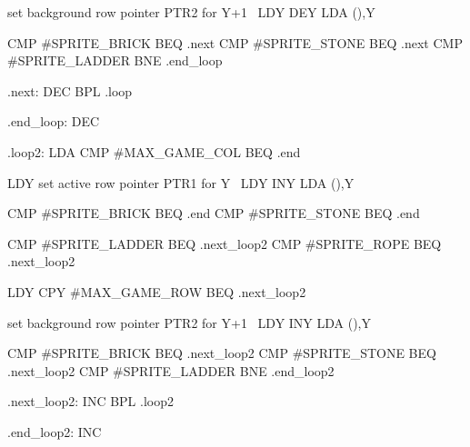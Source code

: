 \documentclass[10pt]{report}%
\begin{document}
    \LA{}set background row pointer \code{}PTR2\edoc{} for \code{}Y+1\edoc{}~{\nwtagstyle{}}\RA{}
    LDY     
    DEY
    LDA     (),Y

    CMP     #SPRITE_BRICK
    BEQ     .next
    CMP     #SPRITE_STONE
    BEQ     .next
    CMP     #SPRITE_LADDER
    BNE     .end_loop

.next:
    DEC     
    BPL     .loop

.end_loop:
    DEC     

.loop2:
    LDA     
    CMP     #MAX_GAME_COL
    BEQ     .end

    LDY     
    \LA{}set active row pointer \code{}PTR1\edoc{} for \code{}Y\edoc{}~{\nwtagstyle{}}\RA{}
    LDY     
    INY
    LDA     (),Y

    CMP     #SPRITE_BRICK
    BEQ     .end
    CMP     #SPRITE_STONE
    BEQ     .end

    CMP     #SPRITE_LADDER
    BEQ     .next_loop2
    CMP     #SPRITE_ROPE
    BEQ     .next_loop2

    LDY     
    CPY     #MAX_GAME_ROW
    BEQ     .next_loop2

    \LA{}set background row pointer \code{}PTR2\edoc{} for \code{}Y+1\edoc{}~{\nwtagstyle{}}\RA{}
    LDY     
    INY
    LDA     (),Y

    CMP     #SPRITE_BRICK
    BEQ     .next_loop2
    CMP     #SPRITE_STONE
    BEQ     .next_loop2
    CMP     #SPRITE_LADDER
    BNE     .end_loop2

.next_loop2:
    INC     
    BPL     .loop2

.end_loop2:
    INC     
\end{document}
